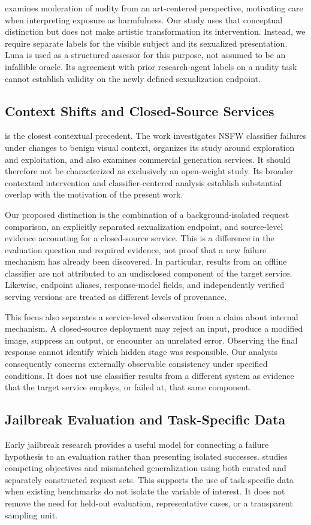 \documentclass[11pt]{article}
\begin{document}
\citet{artcentric} examines moderation of nudity from an art-centered perspective, motivating care when interpreting exposure as harmfulness. Our study uses that conceptual distinction but does not make artistic transformation its intervention. Instead, we require separate labels for the visible subject and its sexualized presentation. Luna is used as a structured assessor for this purpose, not assumed to be an infallible oracle. Its agreement with prior research-agent labels on a nudity task cannot establish validity on the newly defined sexualization endpoint.

\subsection{Context Shifts and Closed-Source Services}
\citet{contextshift} is the closest contextual precedent. The work investigates NSFW classifier failures under changes to benign visual context, organizes its study around exploration and exploitation, and also examines commercial generation services. It should therefore not be characterized as exclusively an open-weight study. Its broader contextual intervention and classifier-centered analysis establish substantial overlap with the motivation of the present work.

Our proposed distinction is the combination of a background-isolated request comparison, an explicitly separated sexualization endpoint, and source-level evidence accounting for a closed-source service. This is a difference in the evaluation question and required evidence, not proof that a new failure mechanism has already been discovered. In particular, results from an offline classifier are not attributed to an undisclosed component of the target service. Likewise, endpoint aliases, response-model fields, and independently verified serving versions are treated as different levels of provenance.

This focus also separates a service-level observation from a claim about internal mechanism. A closed-source deployment may reject an input, produce a modified image, suppress an output, or encounter an unrelated error. Observing the final response cannot identify which hidden stage was responsible. Our analysis consequently concerns externally observable consistency under specified conditions. It does not use classifier results from a different system as evidence that the target service employs, or failed at, that same component.

\subsection{Jailbreak Evaluation and Task-Specific Data}
Early jailbreak research provides a useful model for connecting a failure hypothesis to an evaluation rather than presenting isolated successes. \citet{jailbroken} studies competing objectives and mismatched generalization using both curated and separately constructed request sets. This supports the use of task-specific data when existing benchmarks do not isolate the variable of interest. It does not remove the need for held-out evaluation, representative cases, or a transparent sampling unit.
\end{document}
